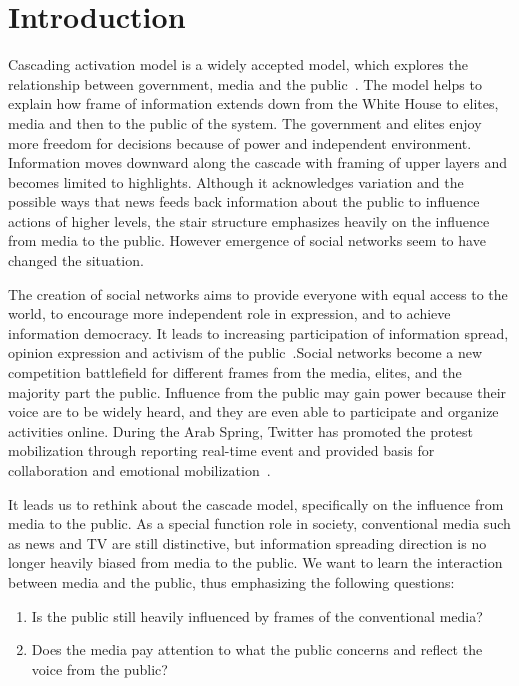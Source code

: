 \section{Introduction}
\label{sec:intro}

Cascading activation model is a widely accepted model, which explores the relationship between government, media and the public~\cite{entman1993framing}. The model helps to explain how frame of information extends down from the White House to elites, media and then to the public of the system. The government and elites enjoy more freedom for decisions because of power and independent environment. Information moves downward along the cascade with framing of upper layers and becomes limited to highlights. Although it acknowledges variation and the possible ways that news feeds back information about the public to influence actions of higher levels, the stair structure emphasizes heavily on the influence from media to the public. However emergence of social networks seem to have changed the situation.

The creation of social networks aims to provide everyone with equal access to the world, to encourage more independent role in expression, and to achieve information democracy. It leads to increasing participation of information spread, opinion expression and activism of the public~\cite{kelly2006protest,gonzalez2011dynamics,tufekci2012social}.Social networks become a new competition battlefield for different frames from the media, elites, and the majority part the public. Influence from the public may gain power because their voice are to be widely heard, and they are even able to participate and organize activities online. During the Arab Spring, Twitter has promoted the protest mobilization through reporting real-time event and provided basis for collaboration and emotional mobilization~\cite{breuer2014social}.

It leads us to rethink about the cascade model, specifically on the influence from media to the public. As a special function role in society, conventional media such as news and TV are still distinctive, but information spreading direction is no longer heavily biased from media to the public. We want to learn the interaction between media and the public, thus emphasizing the following questions:

\begin{enumerate}
\item Is the public still heavily influenced by frames of the conventional media?
\item Does the media pay attention to what the public concerns and reflect the voice from the public?
\end{enumerate}

